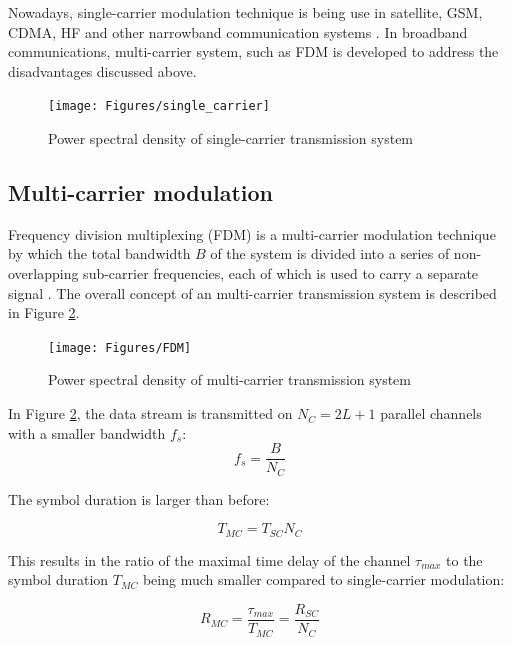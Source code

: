 Nowadays, single-carrier modulation technique is being use in satellite, GSM, CDMA, HF and other narrowband communication systems \cite{rfwireless}. In broadband communications, multi-carrier system, such as FDM is developed to address the disadvantages discussed above.

\begin{figure}[htbp]
    \centering
    \texttt{[image: Figures/single\_carrier]}
    \caption{Power spectral density of single-carrier transmission system}
    \label{fig:single-carrier}
\end{figure}

\subsection{Multi-carrier modulation}
Frequency division multiplexing (FDM) is a multi-carrier modulation technique by which the total bandwidth $B$ of the system is divided into a series of non-overlapping sub-carrier frequencies, each of which is used to carry a separate signal \cite{b2}. The overall concept of an multi-carrier transmission system is described in Figure \ref{fig:FDM}.

\begin{figure}[htbp]
    \centering
    \texttt{[image: Figures/FDM]}
    \caption{Power spectral density of multi-carrier transmission system}
    \label{fig:FDM}
\end{figure}

In Figure \ref{fig:FDM}, the data stream is transmitted on $N_C = 2L + 1$ parallel channels with a smaller bandwidth $f_s$:
\begin{equation}
    f_s = \frac{B}{N_C}
\end{equation}

The symbol duration is larger than before:

\begin{equation}
    T_{MC} = T_{SC} N_C
\end{equation}

This results in the ratio of the maximal time delay of the channel $\tau_{max}$ to the symbol duration $T_{MC}$ being much smaller compared to single-carrier modulation:

\begin{equation}
    R_{MC} = \frac{\tau_{max}}{T_{MC}} = \frac{R_{SC}}{N_C}
\end{equation}

